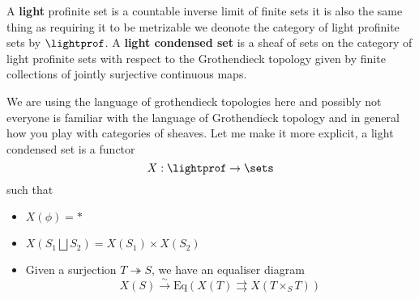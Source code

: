 \begin{definition}
    A \textbf{light} profinite set is a countable inverse limit of finite sets it is also the same thing as requiring it to be metrizable we deonote the category of light profinite sets by $\lightprof$. A \textbf{light condensed set} is a sheaf of sets on the category of light profinite sets with respect to the Grothendieck topology given by finite collections of jointly surjective continuous maps.
\end{definition}    

We are using the language of grothendieck topologies here and possibly not everyone is familiar with the language of Grothendieck topology and in  general how you play with categories of sheaves. Let me make it more explicit, a light condensed set is a functor 
$$ X : \lightprof \rightarrow \sets$$
such that 
\begin{itemize}
    \item $X(\phi) = *$
    \item $X(S_1 \bigsqcup S_2) = X(S_1) \times X(S_2)$
    \item Given a surjection $T \twoheadrightarrow S$, we have an equaliser diagram 
    $$X(S) \xrightarrow{\sim} \mathrm{Eq}(X(T) \rightrightarrows X(T \times_S T))$$
\end{itemize}


